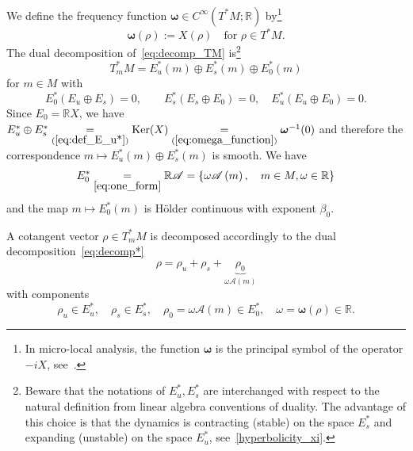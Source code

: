 \documentclass[10pt]{amsart}
\theoremstyle{definition}\newtheorem{defi}[theo]{Definition}\newtheorem{rema}[theo]{Remark}\newtheorem{exam}[theo]{Example}\newtheorem{exem}[theo]{Example}\newtheorem{nota}[theo]{Notation}
\newcommand*\eq[1]{\underset{(#1)}{=}}
\newcommand{\Kerr}{\mathrm{Ker}}
\newcommand{\bbR}{\mathbb{R}}
\newcommand{\scrA}{\mathscr{A}}
\begin{document}
We define the frequency function $\boldsymbol{\omega}\in C^{\infty}(T^{*}M;\bbR)$ by\footnote{In micro-local analysis, the function $\boldsymbol{\omega}$ is the principal symbol of the operator $-iX$, see~\cite[footnote on p.~332.]{fred_flow_09}.}
\begin{equation}\label{eq:omega_function}
\boldsymbol{\omega}\left(\rho\right):=X\left(\rho\right)\quad\text{for }\rho\in T^{*}M.
\end{equation}
The dual decomposition of~\eqref{eq:decomp_TM} is\footnote{Beware that the notations of $E_{u}^{*},E_{s}^{*}$ are interchanged with respect to the natural definition from linear algebra conventions of duality. The advantage of this choice is that the dynamics is contracting (stable) on the space $E_{s}^{*}$ and expanding (unstable) on the space $E_{u}^{*}$, see~\eqref{hyperbolicity_xi}.}
\begin{equation}\label{eq:decomp*}
T_{m}^{*}M=E_{u}^{*}\left(m\right)\oplus E_{s}^{*}\left(m\right)\oplus E_{0}^{*}\left(m\right)
\end{equation}
for $m\in M$ with
\begin{equation}\label{eq:def_E_u*}
E_{0}^{*}\left(E_{u}\oplus E_{s}\right)=0,\qquad E_{s}^{*}\left(E_{s}\oplus E_{0}\right)=0,\quad E_{u}^{*}\left(E_{u}\oplus E_{0}\right)=0.
\end{equation}
Since $E_{0}=\bbR X$, we have $E_{u}^{*}\oplus E_{s}^{*}\eq{\ref{eq:def_E_u*}}\Kerr(X)\eq{\ref{eq:omega_function}}\boldsymbol{\omega}^{-1}(0)$ and therefore the correspondence $m\mapsto E_{u}^{*}(m)\oplus E_{s}^{*}(m)$ is smooth. We have
\begin{equation}\label{eq:def_E_0*}
E_{0}^{*}\underset{\eqref{eq:one_form}}{=}\bbR\scrA=\left\{ \omega\scrA\left(m\right),\quad m\in M,\omega\in\bbR\right\} 
\end{equation}
and the map $m\mapsto E_{0}^{*}(m)$ is H\"older continuous with exponent $\beta_{0}$.

A cotangent vector $\rho\in T_{m}^{*}M$ is decomposed accordingly to the dual decomposition~\eqref{eq:decomp*}
\begin{equation}\label{eq:decomp_Xi}
\rho=\rho_{u}+\rho_{s}+\underbrace{\rho_{0}}_{\omega\scrA\left(m\right)}
\end{equation}
with components
\[
\rho_{u}\in E_{u}^{*},\quad\rho_{s}\in E_{s}^{*},\quad\rho_{0}=\omega\scrA\left(m\right)\in E_{0}^{*},\quad\omega=\boldsymbol{\omega}\left(\rho\right)\in\bbR.
\]
\end{document}
